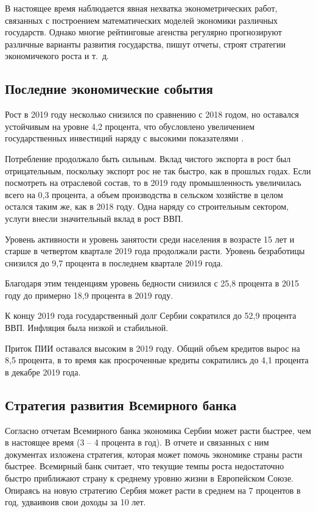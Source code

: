 
В настоящее время наблюдается явная нехватка эконометрических работ, связанных с построением математических моделей экономики различных государств.
Однако многие рейтинговые агенства регулярно прогнозируют различные варианты развития государства, пишут отчеты, строят стратегии экономичекого роста и т.~д.

\subsection{Последние экономические события}

Рост в 2019 году несколько снизился по сравнению с 2018 годом, но оставался устойчивым на уровне 4,2 процента, что обусловлено увеличением государственных инвестиций наряду с высокими показателями .

Потребление продолжало быть сильным.
Вклад чистого экспорта в рост был отрицательным, поскольку экспорт рос не так быстро, как в прошлых годах.
Если посмотреть на отраслевой состав, то в 2019 году промышленность увеличилась всего на 0,3 процента, а объем производства в сельском хозяйстве в целом остался таким же, как в 2018 году.
Одна наряду со строительным сектором, услуги внесли значительный вклад в рост ВВП.

Уровень активности и уровень занятости среди населения в возрасте 15 лет и старше в четвертом квартале 2019 года продолжали расти.
Уровень безработицы снизился до 9,7 процента в последнем квартале 2019 года.

Благодаря этим тенденциям уровень бедности снизился с 25,8 процента в 2015 году до примерно 18,9 процента в 2019 году.

К концу 2019 года государственный долг Сербии сократился до 52,9 процента ВВП.
Инфляция была низкой и стабильной.

Приток ПИИ оставался высоким в 2019 году.
Общий объем кредитов вырос на 8,5 процента, в то время как просроченные кредиты сократились до 4,1 процента в декабре 2019 года.

\subsection{Стратегия развития Всемирного банка}

Согласно отчетам Всемирного банка экономика Сербии может расти быстрее, чем в настоящее время (3 -- 4 процента в год).
В отчете \cite{worldbank_cem} и связанных с ним документах \cite{worldbank_investment,worldbank_financing, worldbank_productivity, worldbank_encouraging, worldbank_labormarket, worldbank_barriers, worldbank_aid, worldbank_workforce} изложена стратегия, которая может помочь экономике страны расти быстрее.
Всемирный банк считает, что текущие темпы роста недостаточно быстро приближают страну к среднему уровню жизни в Европейском Союзе.
Опираясь на новую стратегию Сербия может расти в среднем на 7 процентов в год, удваивоив свои доходы за 10 лет.

